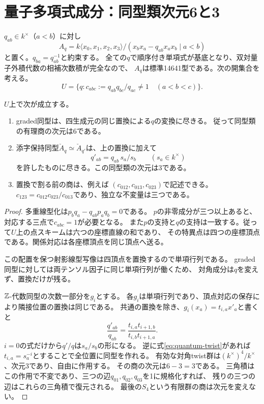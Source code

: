 \section{量子多項式成分：同型類次元6と3}\label{sec:quantum}
$q_{ab}\in k^\times$（$a<b$）に対し
\[
 A_q=k\langle x_0,x_1,x_2,x_3\rangle/
 (x_bx_a-q_{ab}x_ax_b\mid a<b)
\]
と置く。$q_{ba}=q_{ab}^{-1}$と約束する。
全ての$q$で順序付き単項式が基底となり、双対量子外積代数の相補次数積が完全なので、
$A_q$は標準14641型である。次の開集合を考える。
\[
 U=\{q:c_{abc}:=q_{ab}q_{bc}/q_{ac}\ne1\quad(a<b<c)\}.
\]

\begin{theorem}[量子多項式族の二つの同型分類]\label{thm:quantum-orbits}
$U$上で次が成立する。
\begin{enumerate}
\item graded同型は、四生成元の同じ置換による$q$の変換に尽きる。
従って同型類の有理商の次元は6である。
\item 添字保持同型$\check A_q\simeq\check A_{q'}$は、上の置換に加えて
\begin{equation}\label{eq:quantum-twist}
 q'_{ab}=q_{ab}\,s_a/s_b\qquad(s_a\in k^\times)
\end{equation}
を許したものに尽きる。この同型類の次元は3である。
\item 置換で割る前の商は、例えば
$(c_{012},c_{013},c_{023})$で記述できる。
$c_{123}=c_{012}c_{023}/c_{013}$であり、独立な不変量は三つである。
\end{enumerate}
\end{theorem}
\begin{proof}
多重線型化は$p_bq_a-q_{ab}p_aq_b=0$である。
$p$の非零成分が三つ以上あると、対応する三点で$c_{abc}=1$が必要となる。
また$p$の支持と$q$の支持は一致する。従って$U$上の点スキームは六つの座標直線の和であり、
その特異点は四つの座標頂点である。関係対応は各座標頂点を同じ頂点へ送る。

この配置を保つ射影線型写像は四頂点を置換するので単項行列である。
graded同型に対しては両テンソル因子に同じ単項行列が働くため、
対角成分は$q$を変えず、置換だけが残る。

$\mathbb Z$-代数同型の次数一部分を$g_i$とする。
各$g_i$は単項行列であり、頂点対応の保存により隣接位置の置換は同じである。
共通の置換を除き、$g_i(x_a)=t_{i,a}x'_a$と書くと
\[
 \frac{q'_{ab}}{q_{ab}}
 =\frac{t_{i,a}t_{i+1,b}}{t_{i,b}t_{i+1,a}}.
\]
$i=0$の式だけから$q'/q$は$s_a/s_b$の形になる。
逆に式\eqref{eq:quantum-twist}があれば$t_{i,a}=s_a^{-i}$とすることで全位置に同型を作れる。
有効な対角twist群は$(k^\times)^4/k^\times$、次元3であり、自由に作用する。
その商の次元は$6-3=3$である。
三角積はこの作用で不変であり、三つの辺$q_{01},q_{02},q_{03}$を1に規格化すれば、
残りの三つの辺はこれらの三角積で復元される。
最後の$S_4$という有限群の商は次元を変えない。
\end{proof}

